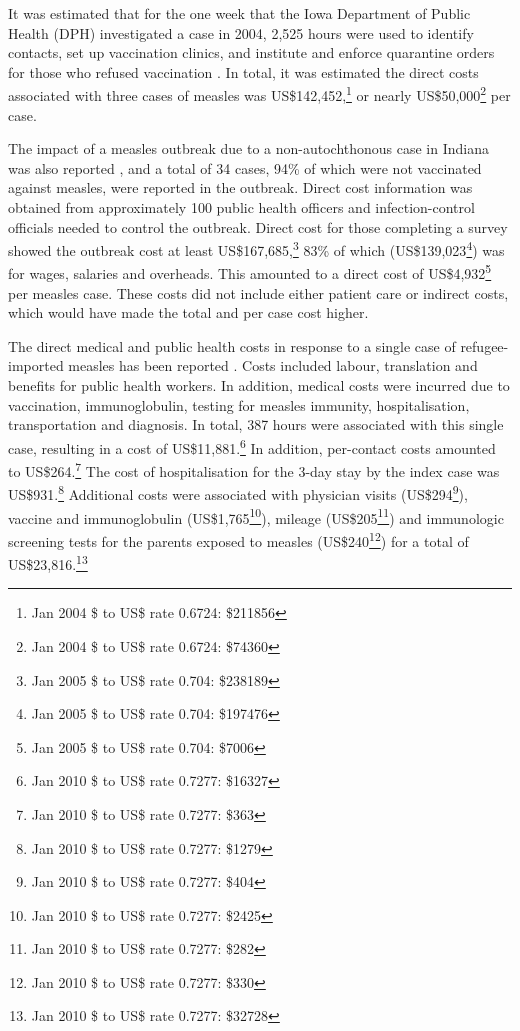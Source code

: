 \documentclass{article}
\begin{document}
It was estimated that for the one week that the Iowa Department of Public Health (DPH) investigated a case in 2004, 2,525 hours were used to identify contacts, set up vaccination clinics, and institute and enforce quarantine orders for those who refused vaccination \citep{dayan5}. In total, it was estimated the direct costs associated with three cases of measles was US\$142,452,\footnote{Jan 2004 \$ to US\$ rate 0.6724: \$211856} or nearly US\$50,000\footnote{Jan 2004 \$ to US\$ rate 0.6724: \$74360} per case.

The impact of a measles outbreak due to a non-autochthonous case in Indiana was also reported \citep{parker6}, and a total of 34 cases, 94\% of which were not vaccinated against measles, were reported in the outbreak. Direct cost information was obtained from approximately 100 public health officers and infection-control officials needed to control the outbreak. Direct cost for those completing a survey showed the outbreak cost at least US\$167,685,\footnote{Jan 2005 \$ to US\$ rate 0.704: \$238189} 83\% of which (US\$139,023\footnote{Jan 2005 \$ to US\$ rate 0.704: \$197476}) was for wages, salaries and overheads. This amounted to a direct cost of US\$4,932\footnote{Jan 2005 \$ to US\$ rate 0.704: \$7006} per measles case. These costs did not include either patient care or indirect costs, which would have made the total and per case cost higher.

The direct medical and public health costs in response to a single case of refugee-imported measles has been reported \citep{coleman12}.  Costs included labour, translation and benefits for public health workers. In addition, medical costs were incurred due to vaccination, immunoglobulin, testing for measles immunity, hospitalisation, transportation and diagnosis. In total, 387 hours were associated with this single case, resulting in a cost of US\$11,881.\footnote{Jan 2010 \$ to US\$ rate 0.7277: \$16327} In addition, per-contact costs amounted to US\$264.\footnote{Jan 2010 \$ to US\$ rate 0.7277: \$363} The cost of hospitalisation for the 3-day stay by the index case was US\$931.\footnote{Jan 2010 \$ to US\$ rate 0.7277: \$1279} Additional costs were associated with physician visits (US\$294\footnote{Jan 2010 \$ to US\$ rate 0.7277: \$404}), vaccine and immunoglobulin (US\$1,765\footnote{Jan 2010 \$ to US\$ rate 0.7277: \$2425}), mileage (US\$205\footnote{Jan 2010 \$ to US\$ rate 0.7277: \$282}) and immunologic screening tests for the parents exposed to measles (US\$240\footnote{Jan 2010 \$ to US\$ rate 0.7277: \$330}) for a total of US\$23,816.\footnote{Jan 2010 \$ to US\$ rate 0.7277: \$32728}
\end{document}
